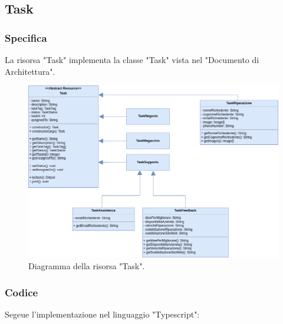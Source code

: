 \documentclass{report}
\begin{document}
\subsection{Task}
\subsubsection*{Specifica}

La risorsa "Task" implementa la classe "Task" vista nel "Documento di Architettura".

\begin{figure}[H]
	\centering\includegraphics[width=1\textwidth]{images/resource_task.png}
	Diagramma della risorsa "Task".
\end{figure}

\subsubsection*{Codice}

Segeue l'implementazione nel linguaggio "Typescript":
\end{document}
